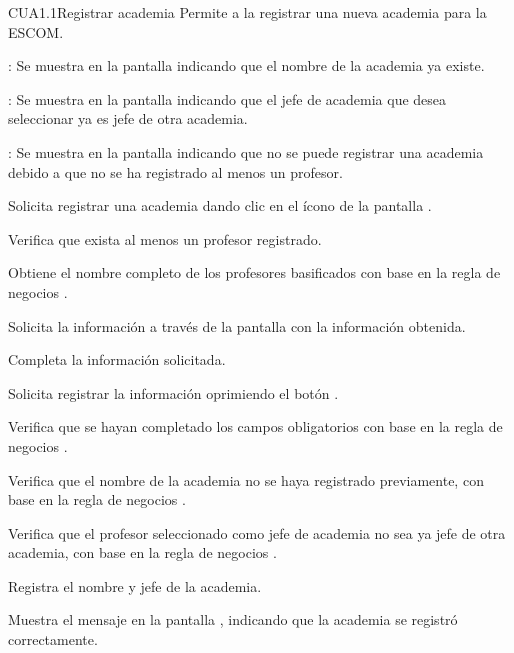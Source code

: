 \begin{UseCase}{CUA1.1}{Registrar academia}{	
	Permite a la  registrar una nueva academia para la ESCOM.
}
{\begin{UClist}
			\UCli {}: Se muestra en la pantalla  indicando que el nombre de la academia ya existe.
			
			\UCli {}: Se muestra en la pantalla  indicando que el jefe de academia que desea seleccionar ya es jefe de otra academia.
			
			\UCli {}: Se muestra en la pantalla  indicando que no se puede registrar una academia debido a que no se ha registrado al menos un profesor.
		\end{UClist}
	}
\end{UseCase}

\begin{UCtrayectoria}
	\UCpaso [\UCactor] Solicita registrar una academia dando clic en el ícono %
	de la pantalla . 
	
	\UCpaso [\UCsist] Verifica que exista al menos un profesor registrado. 
	
	\UCpaso [\UCsist] Obtiene el nombre completo de los profesores basificados con base en la regla de negocios .

	\UCpaso[\UCsist] Solicita la información a través de la pantalla  con la información obtenida.
	
	\UCpaso [\UCactor] Completa la información solicitada. \label{CUA1.1:CompletaInfo}
	
	\UCpaso [\UCactor] Solicita registrar la información oprimiendo el botón . 
	
	\UCpaso [\UCsist] Verifica que se hayan completado los campos obligatorios con base en la regla de negocios . 
	
	\UCpaso [\UCsist] Verifica que el nombre de la academia no se haya registrado previamente, con base en la regla de negocios . 
		
	\UCpaso [\UCsist] Verifica que el profesor seleccionado como jefe de academia no sea ya jefe de otra academia, con base en la regla de negocios . 
	
	\UCpaso [\UCsist] Registra el nombre y jefe de la academia.
	
	\UCpaso [\UCsist] Muestra el mensaje  en la pantalla , indicando que la academia se registró correctamente.	
	
\end{UCtrayectoria}

